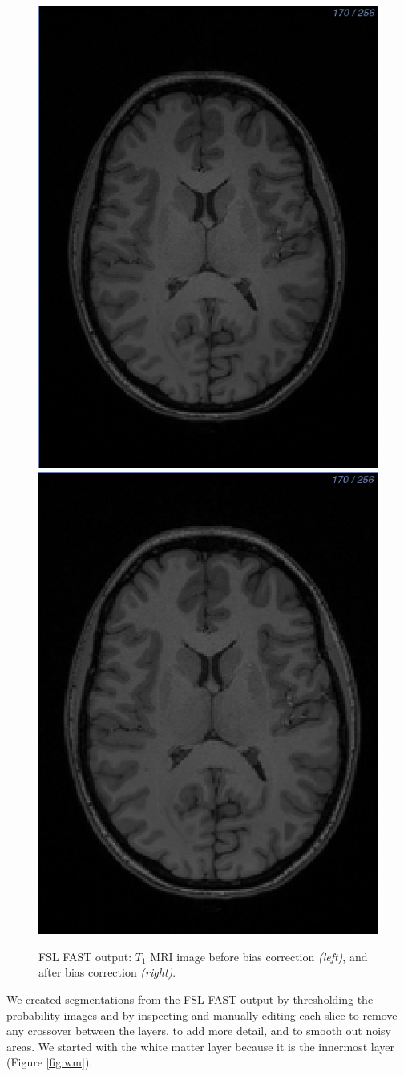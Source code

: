 \begin{figure}[H]
\begin{center}
\includegraphics[width=.45\textwidth]{Figures/Original_T1}
\includegraphics[width=.45\textwidth]{Figures/T1_corrected}
\caption{FSL FAST output: $T_1$ MRI image before bias correction \textit{(left)}, and after bias correction \textit{(right)}.}
\label{fig:fastoutbias}
\end{center}
\end{figure}


We created segmentations from the FSL FAST output by thresholding the probability images and by inspecting and manually editing each slice to remove any crossover between the layers, to add more detail, and to smooth out noisy areas. We started with the white matter layer because it is the innermost layer (Figure \ref{fig:wm}).

